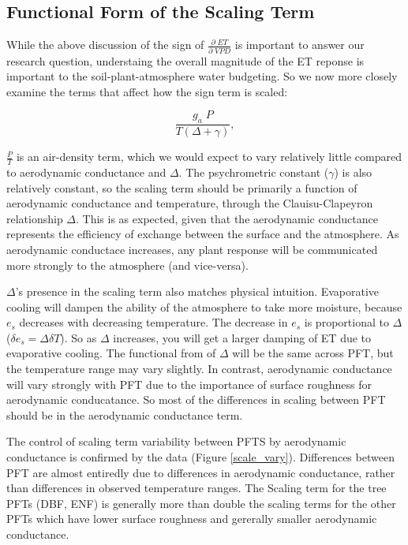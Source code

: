 \documentclass[draft,linenumbers]{agujournal}
\begin{document}
\subsection{Functional Form of the Scaling Term}

While the above discussion of the sign of $\frac{\partial \; ET}{\partial \; VPD}$ is important to answer our research question, understaing the overall magnitude of the ET reponse is important to the soil-plant-atmosphere water budgeting. So we now more closely examine the terms that affect how the sign term is scaled:

\begin{equation}
  \frac{g_a \; P}{T(\Delta + \gamma)},
\end{equation}

$\frac{P}{T}$ is an air-density term, which we would expect to vary relatively little compared to aerodynamic conductance and $\Delta$. The psychrometric constant ($\gamma$) is also relatively constant, so the scaling term should be primarily a function of aerodynamic conductance and temperature, through the Clauisu-Clapeyron relationship $\Delta$. This is as expected, given that the aerodynamic conductance represents the efficiency of exchange between the surface and the atmosphere. As aerodynamic conductace  increases, any plant response will be communicated more strongly to the atmosphere (and vice-versa).

$\Delta$'s presence in the scaling term also matches physical intuition. Evaporative cooling will dampen the ability of the atmosphere to take more moisture, because $e_{s}$ decreases with decreasing temperature. The decrease in $e_{s}$ is proportional to $\Delta$ ($\delta e_{s} = \Delta \delta T$). So as $\Delta$ increases, you will get a larger damping of ET due to evaporative cooling.  The functional from of $\Delta$ will be the same across PFT, but the temperature range may vary slightly. In contrast, aerodynamic conductance will vary strongly with PFT due to the importance of surface roughness for aerodynamic conducatance. So most of the differences in scaling between PFT should be in the aerodynamic conductance term. 

The control of scaling term variability between PFTS by aerodynamic conductance is confirmed by the data (Figure \ref{scale_vary}). Differences between PFT are almost entiredly due to differences in aerodynamic conductance, rather than differences in observed temperature ranges. The Scaling term for the tree PFTs (DBF, ENF) is generally more than double the scaling terms for the other PFTs which have lower surface roughness and gererally smaller aerodynamic conductance.
\end{document}
